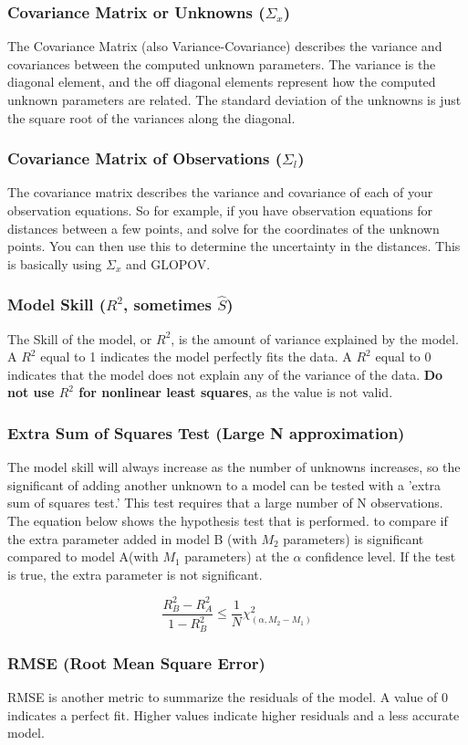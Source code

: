 \subsubsection*{Covariance Matrix or Unknowns ($\Sigma_x$) }
The Covariance Matrix (also Variance-Covariance) describes the variance and covariances between the computed unknown parameters.  The variance is the diagonal element, and the off diagonal elements represent how the computed unknown parameters are related.  The standard deviation of the unknowns is just the square root of the variances along the diagonal.  

\subsubsection*{Covariance Matrix of Observations ($\Sigma_l$)}
The covariance matrix describes the variance and covariance of each of your observation equations.  So for example, if you have observation equations for distances between a few points, and solve for the coordinates of the unknown points.  You can then use this to determine the uncertainty in the distances. This is basically using $\Sigma_x$ and GLOPOV.  


\subsubsection*{Model Skill ($R^2$, sometimes $\hat{S}$)}
The Skill of the model, or $R^2$, is the amount of variance explained by the model.  A $R^2$ equal to 1 indicates the model perfectly fits the data.  A $R^2$ equal to 0 indicates that the model does not explain any of the variance of the data.  \textbf{Do not use $R^2$ for nonlinear least squares}, as the value is not valid.  

\subsubsection*{Extra Sum of Squares Test (Large N approximation)}
The model skill will always increase as the number of unknowns increases, so the significant of adding another unknown to a model can be tested with a 'extra sum of squares test.'  This test requires that a large number of N observations.  The equation below shows the hypothesis test that is performed. to compare if the extra parameter added in model B (with $M_2$ parameters) is significant compared to model A(with $M_1$ parameters) at the $\alpha$ confidence level.  If the test is true, the extra parameter is not significant.

\[
\dfrac{R_B^2 - R_A^2}{1 - R_B^2} \leq \dfrac{1}{N}\chi_{(\alpha,M_2-M_1)}^2
\]

\subsubsection*{RMSE (Root Mean Square Error)}
RMSE is another metric to summarize the residuals of the model.  A value of 0 indicates a perfect fit.  Higher values indicate higher residuals and a less accurate model.
